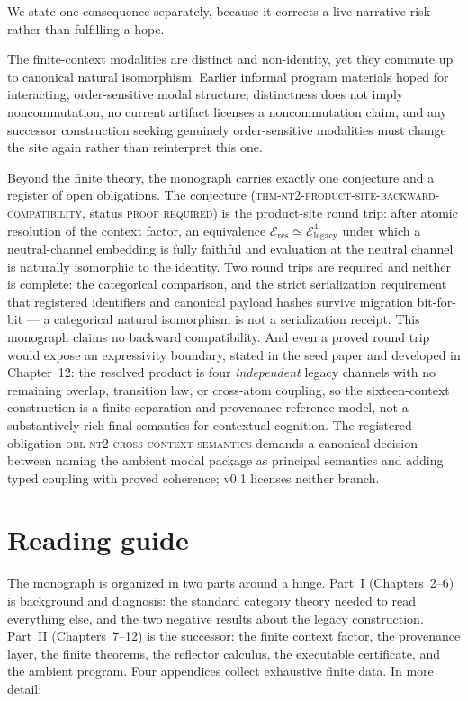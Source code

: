 We state one consequence separately, because it corrects a live
narrative risk rather than fulfilling a hope.

\begin{finding}\label{ch01:finding:commuting}
The finite-context modalities are distinct and non-identity, yet they
commute up to canonical natural isomorphism. Earlier informal program
materials hoped for interacting, order-sensitive modal structure;
distinctness does not imply noncommutation, no current artifact licenses a
noncommutation claim, and any successor construction seeking genuinely
order-sensitive modalities must change the site again rather than
reinterpret this one.
\end{finding}

Beyond the finite theory, the monograph carries exactly one conjecture and a
register of open obligations. The conjecture
(\textsc{thm-nt2-product-site-backward-compatibility}, status
\textsc{proof required}) is the product-site round trip: after atomic
resolution of the context factor, an equivalence
$\mathcal{E}_{\mathrm{res}} \simeq \mathcal{E}_{\mathrm{legacy}}^{4}$ under
which a neutral-channel embedding is fully faithful and evaluation at the
neutral channel is naturally isomorphic to the identity. Two round trips are
required and neither is complete: the categorical comparison, and the strict
serialization requirement that registered identifiers and canonical payload
hashes survive migration bit-for-bit --- a categorical natural isomorphism
is not a serialization receipt. This monograph claims no backward
compatibility. And even a proved round trip would expose an expressivity
boundary, stated in the seed paper and developed in Chapter~12: the resolved
product is four \emph{independent} legacy channels with no remaining
overlap, transition law, or cross-atom coupling, so the sixteen-context
construction is a finite separation and provenance reference model, not a
substantively rich final semantics for contextual cognition. The registered
obligation \textsc{obl-nt2-cross-context-semantics} demands a canonical
decision between naming the ambient modal package as principal semantics and
adding typed coupling with proved coherence; v0.1 licenses neither branch.

\section{Reading guide}\label{ch01:sec:guide}

The monograph is organized in two parts around a hinge. Part~I
(Chapters~2--6) is background and diagnosis: the standard category theory
needed to read everything else, and the two negative results about the
legacy construction. Part~II (Chapters~7--12) is the successor: the finite
context factor, the provenance layer, the finite theorems, the reflector
calculus, the executable certificate, and the ambient program. Four
appendices collect exhaustive finite data. In more detail:

